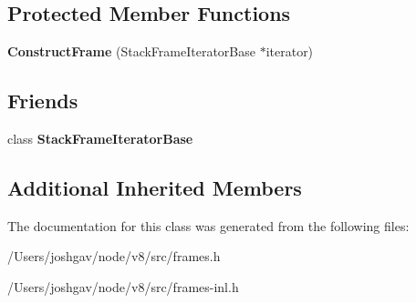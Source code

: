 \subsection*{Protected Member Functions}
\begin{DoxyCompactItemize}
\item 
{\bfseries Construct\+Frame} (Stack\+Frame\+Iterator\+Base $\ast$iterator)\hypertarget{classv8_1_1internal_1_1_construct_frame_ac4c5d9185272361659321552533290c2}{}\label{classv8_1_1internal_1_1_construct_frame_ac4c5d9185272361659321552533290c2}

\end{DoxyCompactItemize}
\subsection*{Friends}
\begin{DoxyCompactItemize}
\item 
class {\bfseries Stack\+Frame\+Iterator\+Base}\hypertarget{classv8_1_1internal_1_1_construct_frame_ac7310421866976ca454bbe11c5f926c3}{}\label{classv8_1_1internal_1_1_construct_frame_ac7310421866976ca454bbe11c5f926c3}

\end{DoxyCompactItemize}
\subsection*{Additional Inherited Members}


The documentation for this class was generated from the following files\+:\begin{DoxyCompactItemize}
\item 
/\+Users/joshgav/node/v8/src/frames.\+h\item 
/\+Users/joshgav/node/v8/src/frames-\/inl.\+h\end{DoxyCompactItemize}
